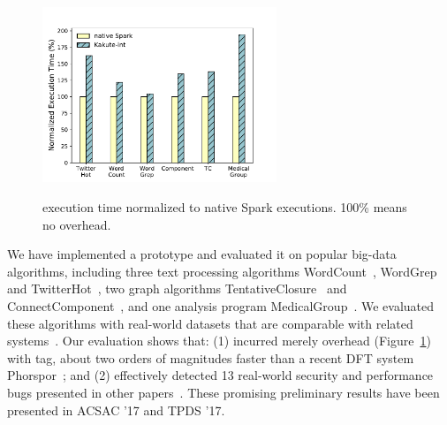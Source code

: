 \begin{figure}
  \vspace{-.1in}
  \includegraphics[width=7cm]{figures/time_overhead.pdf}\\
  \vspace{-.3in}
  \caption{\kakute execution time normalized to native Spark executions. 100\% 
means no overhead.}
  \label{fig:scalability}
\end{figure}

 We have implemented a \kakute prototype 
and evaluated it on \appeval popular big-data algorithms, including three text 
processing algorithms WordCount~\cite{spark:example}, 
WordGrep~\cite{newt:socc13} and TwitterHot~\cite{spark:example}, two graph 
algorithms TentativeClosure~\cite{spark:example}
and ConnectComponent~\cite{spark:example}, and one analysis program 
MedicalGroup~\cite{pigmix}.
We evaluated these algorithms with 
real-world datasets that are comparable with related 
systems~\cite{vldb16:output, icse16:bigdebug, vldb15:titian}.
Our evaluation shows that: (1) \kakute 
incurred merely \timeavg overhead (Figure~\ref{fig:scalability}) with 
 tag, about two orders of magnitudes faster than a recent DFT 
system Phorspor~\cite{oo14:phosphor}; and (2) \kakute effectively 
detected 13 real-world security and performance bugs presented in other 
papers~\cite{arthur:dave2013,icse16:bigdebug,airavat:nsdi10}. These promising 
preliminary results have been presented in ACSAC '17 and TPDS '17.












